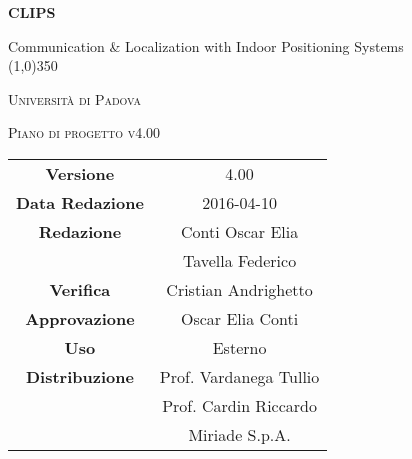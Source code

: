 \documentclass[a4paper,12pt]{article}
\author{Eduard Bicego, Federico Tavella, Andrea Tombolato}
\date{20/01/2016}
\begin{document}
	\begin{titlepage}
		\centering
		{\huge\bfseries CLIPS\par}
		Communication \& Localization with Indoor Positioning Systems \\
		\line(1,0){350} \\
		{\scshape\LARGE Università di Padova \par}
		\vspace{1cm}
		{\scshape\Large Piano di progetto v4.00\par}
		\logo
	
		\vfill \vfill
		\begin{tabular}{c|c}
			{\hfill \textbf{Versione}} 		& 4.00				\\
			{\hfill\textbf{Data Redazione}} 	& 2016-04-10			\\
			{\hfill\textbf{Redazione}} 		& Conti Oscar Elia 		\\
											& Tavella Federico		\\ 
			{\hfill\textbf{Verifica}} 		& Cristian Andrighetto 		\\
			{\hfill\textbf{Approvazione}} 		& Oscar Elia Conti 		\\
			{\hfill\textbf{Uso}} 			& Esterno			\\
			{\hfill\textbf{Distribuzione}} 		& Prof. Vardanega Tullio 	\\
								& Prof. Cardin Riccardo 	\\
								& Miriade S.p.A. 		\\
	\end{tabular}
\end{titlepage}

	\pagestyle{myfront}	
	
	\newpage
			
	\newpage
		\tableofcontents 	%
	\newpage
		\listoftables 		%
	\newpage	
		\listoffigures		%
	
	\label{LastFrontPage}

	\newpage
		\pagestyle{mymain}
	
	\newpage
		
	\newpage
		

	\newpage
		
		
	\newpage
		
		
	\newpage
			
		
	\newpage
			

    \newpage
		
		
	\newpage
		
		
	\newpage
		
        		
	\label{LastPage}
\end{document}
